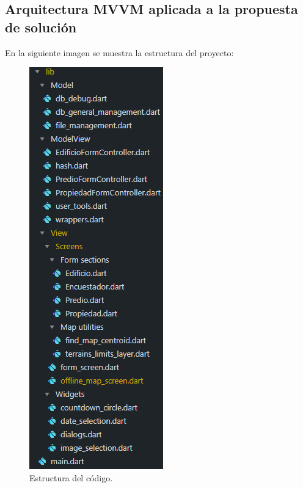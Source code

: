 \subsection{Arquitectura MVVM aplicada a la propuesta de solución}
En la siguiente imagen se muestra la estructura del proyecto:
\begin{figure}[h]
    \centering
    \includegraphics[scale=0.5]{Graphics/Capitulo 3/estructura_del_codigo.png}
    \caption{Estructura del código.} %
    \label{fig:figura14}
\end{figure}

